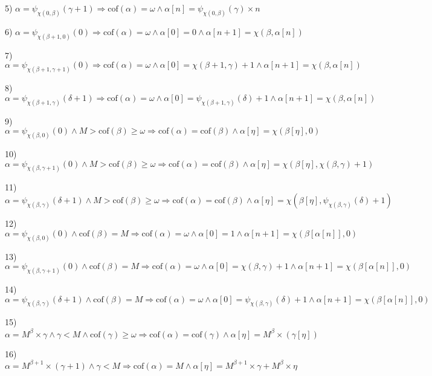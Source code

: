 \documentclass[10pt]{article}
\begin{document}
5) \(\alpha=\psi_{ \chi(0,\beta)}(\gamma+1) \Rightarrow \text{cof}(\alpha)=\omega \wedge \alpha[n]=\psi_{\chi(0,\beta)}(\gamma)\times n\)



6) \(\alpha=\psi _{\chi(\beta+1,0)}(0) \Rightarrow \text{cof}(\alpha)=\omega \wedge \alpha[0]=0 \wedge \alpha[n+1]=\chi(\beta,\alpha[n])\)

7) \(\alpha=\psi _{\chi(\beta+1,\gamma+1)}(0) \Rightarrow \text{cof}(\alpha)=\omega \wedge \alpha[0]=\chi(\beta+1,\gamma)+1 \wedge \alpha[n+1]=\chi(\beta,\alpha[n])\)

8) \(\alpha=\psi_{\chi(\beta+1,\gamma)}(\delta+1) \Rightarrow \text{cof}(\alpha)=\omega \wedge \alpha[0]= \psi_{\chi(\beta+1,\gamma)}(\delta)+1 \wedge \alpha[n+1]=\chi(\beta,\alpha[n])\)


9) \(\alpha=\psi _{\chi(\beta,0)}(0) \wedge M>\text{cof}(\beta)\geq\omega \Rightarrow \text{cof} (\alpha)= \text{cof} (\beta) \wedge \alpha[\eta]=\chi(\beta[\eta],0)\)

10) \(\alpha=\psi_{ \chi(\beta,\gamma+1)}(0) \wedge M>\text{cof}(\beta)\geq\omega \Rightarrow \text{cof}(\alpha)=\text{cof}(\beta)\wedge \alpha[\eta]=\chi(\beta[\eta],\chi(\beta,\gamma)+1)\)

11) \(\alpha=\psi_{ \chi(\beta,\gamma)}(\delta+1) \wedge M>\text{cof} (\beta)\geq\omega \Rightarrow \text{cof}(\alpha)=\text{cof}(\beta) \wedge \alpha[\eta]=\chi(\beta[\eta],\psi_{\chi(\beta,\gamma)}(\delta)+1)\)


12) \(\alpha=\psi_{\chi(\beta,0)}(0) \wedge \text{cof}(\beta)=M\Rightarrow \text{cof}(\alpha)= \omega \wedge \alpha[0]=1 \wedge \alpha[n+1]=\chi(\beta[\alpha[n]],0)\)

13) \(\alpha=\psi_{ \chi(\beta,\gamma+1)}(0) \wedge \text{cof} (\beta)=M \Rightarrow \text{cof} (\alpha)= \omega \wedge \alpha[0]=\chi(\beta,\gamma)+1 \wedge \alpha[n+1]=\chi(\beta[\alpha[n]],0)\)

14) \(\alpha=\psi_{\chi(\beta,\gamma)}(\delta+1) \wedge \text{cof} (\beta)=M \Rightarrow \text{cof} (\alpha)= \omega \wedge \alpha[0]= \psi_{ \chi(\beta,\gamma)}(\delta)+1 \wedge \alpha[n+1]=\chi(\beta[\alpha[n]],0)\)


15) \(\alpha=M^{\beta}\times\gamma \wedge \gamma<M \wedge \text{cof} (\gamma)\geq\omega \Rightarrow \text{cof} (\alpha)= \text{cof}(\gamma)\wedge\alpha[\eta]=M^{\beta}\times(\gamma[\eta])\)

16) \(\alpha=M^{\beta+1}\times(\gamma+1) \wedge \gamma<M \Rightarrow \text{cof} (\alpha)=M \wedge\alpha[\eta]=M^{\beta+1}\times\gamma+M^\beta\times\eta\)
\end{document}
